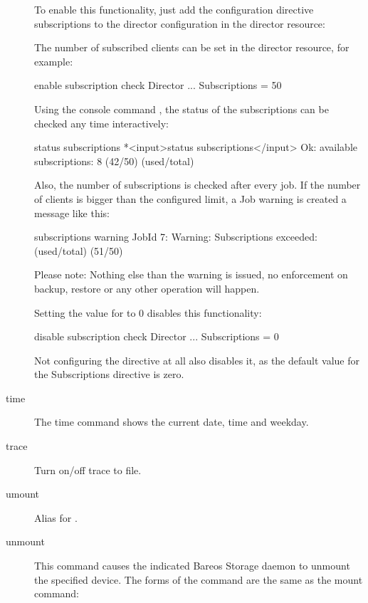 \begin{description}
To enable this functionality, just add the configuration directive subscriptions to the director configuration in the director resource:

The number of subscribed clients can be set in
the director resource, for example:
\begin{bconfig}{enable subscription check}
Director {
   ...
   Subscriptions = 50
}
\end{bconfig}

Using the console command , the status of
the subscriptions can be checked any time interactively:

\begin{bconsole}{status subscriptions}
*<input>status subscriptions</input>
Ok: available subscriptions: 8 (42/50) (used/total)
\end{bconsole}

Also, the number of subscriptions is checked after every job.
If the number of clients is bigger than the configured limit, a Job warning is
created a message like this:
\begin{bconsole}{subscriptions warning}
JobId 7: Warning: Subscriptions exceeded: (used/total) (51/50)
\end{bconsole}

Please note: Nothing else than the warning is issued, no enforcement on
backup, restore or any other operation will happen.

Setting the value for  to 0 disables this functionality:
\begin{bconfig}{disable subscription check}
Director {
   ...
   Subscriptions = 0
}
\end{bconfig}

Not configuring the directive at all also disables it, as the default value for the Subscriptions directive is zero.

\item [time]
   The time command shows the current date, time and weekday.

\item [trace]
   Turn on/off trace to file.

\item [umount]
   Alias for .

\item [unmount]
   This command causes the indicated Bareos Storage  daemon to unmount the
   specified device. The forms of the command  are the same as the mount command:


\end{description}

